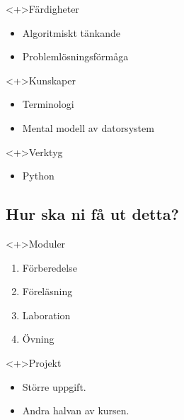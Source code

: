 \begin{frame}
  \begin{block}<+>{Färdigheter}
    \begin{itemize}
      \item Algoritmiskt tänkande
      \item Problemlösningsförmåga
    \end{itemize}
  \end{block}

  \begin{block}<+>{Kunskaper}
    \begin{itemize}
      \item Terminologi
      \item Mental modell av datorsystem
    \end{itemize}
  \end{block}

  \begin{block}<+>{Verktyg}
    \begin{itemize}
      \item Python
    \end{itemize}
  \end{block}
\end{frame}

\subsection{Hur ska ni få ut detta?}

\begin{frame}
  \begin{block}<+>{Moduler}
    \begin{enumerate}
      \item Förberedelse
      \item Föreläsning
      \item Laboration
      \item Övning
    \end{enumerate}
  \end{block}

  \begin{block}<+>{Projekt}
    \begin{itemize}
      \item Större uppgift.
      \item Andra halvan av kursen.
    \end{itemize}
  \end{block}
\end{frame}


